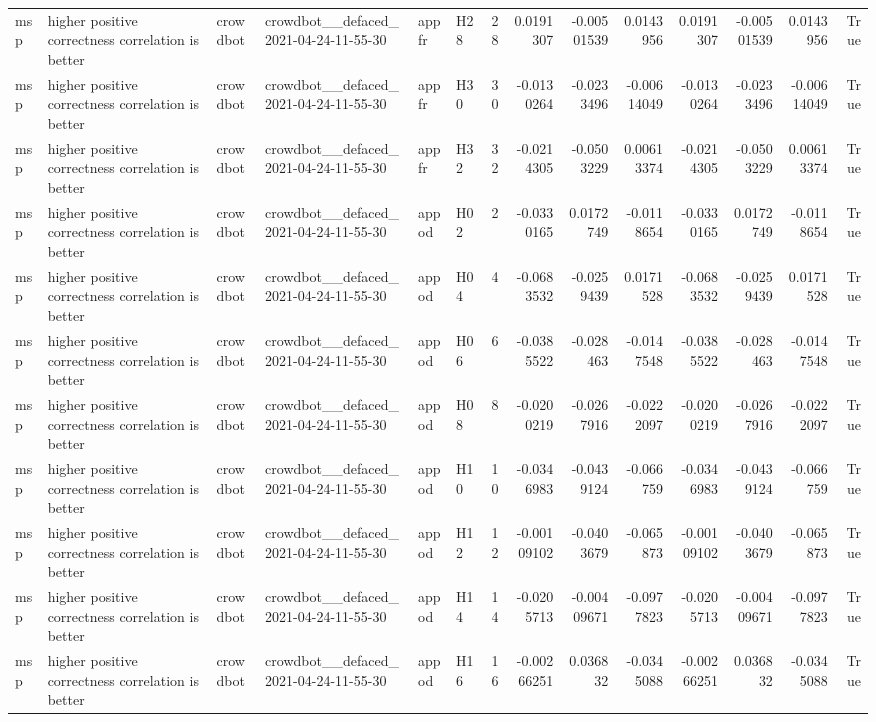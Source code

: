 \begin{longtable}{llllllrrrrrrrr}
msp & higher positive correctness correlation is better & crowdbot & crowdbot\_\_defaced\_2021-04-24-11-55-30 & appfr & H28 & 28 & 0.0191307 & -0.00501539 & 0.0143956 & 0.0191307 & -0.00501539 & 0.0143956 & True \\
msp & higher positive correctness correlation is better & crowdbot & crowdbot\_\_defaced\_2021-04-24-11-55-30 & appfr & H30 & 30 & -0.0130264 & -0.0233496 & -0.00614049 & -0.0130264 & -0.0233496 & -0.00614049 & True \\
msp & higher positive correctness correlation is better & crowdbot & crowdbot\_\_defaced\_2021-04-24-11-55-30 & appfr & H32 & 32 & -0.0214305 & -0.0503229 & 0.00613374 & -0.0214305 & -0.0503229 & 0.00613374 & True \\
msp & higher positive correctness correlation is better & crowdbot & crowdbot\_\_defaced\_2021-04-24-11-55-30 & appod & H02 & 2 & -0.0330165 & 0.0172749 & -0.0118654 & -0.0330165 & 0.0172749 & -0.0118654 & True \\
msp & higher positive correctness correlation is better & crowdbot & crowdbot\_\_defaced\_2021-04-24-11-55-30 & appod & H04 & 4 & -0.0683532 & -0.0259439 & 0.0171528 & -0.0683532 & -0.0259439 & 0.0171528 & True \\
msp & higher positive correctness correlation is better & crowdbot & crowdbot\_\_defaced\_2021-04-24-11-55-30 & appod & H06 & 6 & -0.0385522 & -0.028463 & -0.0147548 & -0.0385522 & -0.028463 & -0.0147548 & True \\
msp & higher positive correctness correlation is better & crowdbot & crowdbot\_\_defaced\_2021-04-24-11-55-30 & appod & H08 & 8 & -0.0200219 & -0.0267916 & -0.0222097 & -0.0200219 & -0.0267916 & -0.0222097 & True \\
msp & higher positive correctness correlation is better & crowdbot & crowdbot\_\_defaced\_2021-04-24-11-55-30 & appod & H10 & 10 & -0.0346983 & -0.0439124 & -0.066759 & -0.0346983 & -0.0439124 & -0.066759 & True \\
msp & higher positive correctness correlation is better & crowdbot & crowdbot\_\_defaced\_2021-04-24-11-55-30 & appod & H12 & 12 & -0.00109102 & -0.0403679 & -0.065873 & -0.00109102 & -0.0403679 & -0.065873 & True \\
msp & higher positive correctness correlation is better & crowdbot & crowdbot\_\_defaced\_2021-04-24-11-55-30 & appod & H14 & 14 & -0.0205713 & -0.00409671 & -0.0977823 & -0.0205713 & -0.00409671 & -0.0977823 & True \\
msp & higher positive correctness correlation is better & crowdbot & crowdbot\_\_defaced\_2021-04-24-11-55-30 & appod & H16 & 16 & -0.00266251 & 0.036832 & -0.0345088 & -0.00266251 & 0.036832 & -0.0345088 & True \\

\end{longtable}

